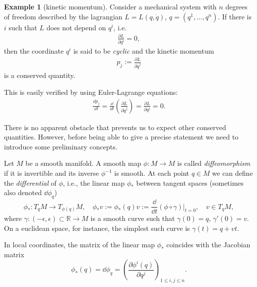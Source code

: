 \documentclass[english,fontsize=11pt,paper=b5]{scrbook}
\theoremstyle{definition}
\newtheorem{example}{Example}[chapter]
\begin{document}
    \begin{example}[kinetic momentum]\label{ex:linearm}
      Consider a mechanical system with $n$ degrees of freedom described by the lagrangian $L=L(q,\dot q)$, $q=(q^1,\ldots,q^n)$.
      If there is $i$ such that $L$ does not depend on $q^i$, i.e.
      \begin{eqnarray}
        \frac{\partial L}{\partial q^i} = 0,
      \end{eqnarray}
      then the coordinate $q^i$ is said to be \emph{cyclic} and the kinetic momentum
      \begin{eqnarray}
        p_j := \frac{\partial L}{\partial\dot q^j}
      \end{eqnarray}
      is a conserved quantity.

      This is easily verified by using Euler-Lagrange equations:
      \begin{eqnarray}
        \frac{\dd p_j}{\dd t} =
        \frac{\dd}{\dd t} \left(\frac{\partial L}{\partial \dot q^j}\right)=
        \frac{\partial L}{\partial q^j} = 0.
      \end{eqnarray}
    \end{example}

    There is no apparent obstacle that prevents us to expect other conserved quantities. However, before being able to give a precise statement we need to introduce some preliminary concepts.

    Let $M$ be a smooth manifold. A smooth map $\phi : M \to M$ is called \emph{diffeomorphism} if it is invertible and its inverse $\phi^{-1}$ is smooth. At each point $q\in M$ we can define the \emph{differential} of $\phi$, i.e., the linear map $\phi_*$ between tangent spaces (sometimes also denoted $\dd\phi_q$)
    \begin{equation}
      \phi_*: T_q M \to T_{\phi(q)} M,
      \quad \phi_* v := \phi_*(q) v := \frac{\dd}{\dd t} (\phi \circ \gamma) \Big|_{t=0},
      \quad v\in T_q M,
    \end{equation}
    where $\gamma:(-\epsilon, \epsilon)\subset\mathbb{R} \to M$ is a smooth curve such that $\gamma(0)=q$, $\gamma'(0) = v$.
    On a euclidean space, for instance, the simplest such curve is $\gamma(t) = q + v t$.

    In local coordinates, the matrix of the linear map $\phi_*$ coincides with the Jacobian matrix
    \begin{equation}
      \phi_*(q) = \dd \phi_q = \left(\frac{\partial \phi^i(q)}{\partial q^j}\right)_{1\leq i,j\leq n}.
    \end{equation}
\end{document}

